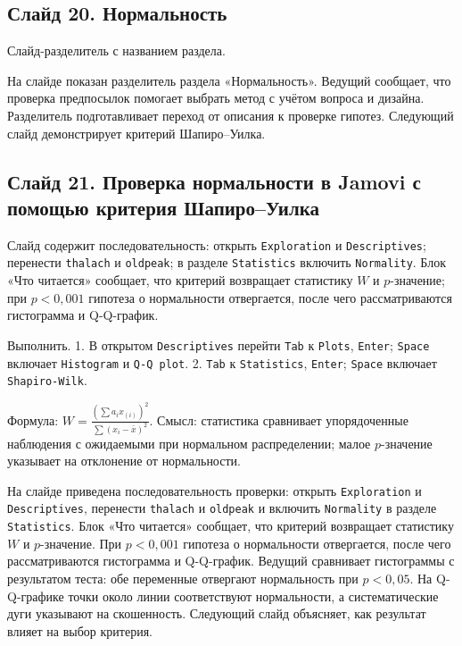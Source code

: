 \documentclass[11pt,a4paper]{article}
\begin{document}
\subsection*{Слайд 20. Нормальность}
\begin{onslide}
Слайд-разделитель с названием раздела.
\end{onslide}
На слайде показан разделитель раздела «Нормальность». Ведущий сообщает, что проверка предпосылок помогает выбрать метод с учётом вопроса и дизайна. Разделитель подготавливает переход от описания к проверке гипотез. Следующий слайд демонстрирует критерий Шапиро--Уилка.

\subsection*{Слайд 21. Проверка нормальности в Jamovi с помощью критерия Шапиро–Уилка}
\begin{onslide}
Слайд содержит последовательность: открыть \texttt{Exploration} и \texttt{Descriptives}; перенести \texttt{thalach} и \texttt{oldpeak}; в разделе \texttt{Statistics} включить \texttt{Normality}. Блок «Что читается» сообщает, что критерий возвращает статистику $W$ и $p$-значение; при $p < 0{,}001$ гипотеза о нормальности отвергается, после чего рассматриваются гистограмма и Q-Q-график.
\end{onslide}
\begin{jamovi}
Выполнить. 1. В открытом \texttt{Descriptives} перейти \texttt{Tab} к \texttt{Plots}, \texttt{Enter}; \texttt{Space} включает \texttt{Histogram} и \texttt{Q-Q plot}. 2. \texttt{Tab} к \texttt{Statistics}, \texttt{Enter}; \texttt{Space} включает \texttt{Shapiro-Wilk}.
\par Формула: $W=\frac{(\sum a_i x_{(i)})^2}{\sum(x_i-\bar{x})^2}$. Смысл: статистика сравнивает упорядоченные наблюдения с ожидаемыми при нормальном распределении; малое $p$-значение указывает на отклонение от нормальности.
\end{jamovi}
На слайде приведена последовательность проверки: открыть \texttt{Exploration} и \texttt{Descriptives}, перенести \texttt{thalach} и \texttt{oldpeak} и включить \texttt{Normality} в разделе \texttt{Statistics}. Блок «Что читается» сообщает, что критерий возвращает статистику $W$ и $p$-значение. При $p < 0{,}001$ гипотеза о нормальности отвергается, после чего рассматриваются гистограмма и Q-Q-график. Ведущий сравнивает гистограммы с результатом теста: обе переменные отвергают нормальность при $p < 0{,}05$. На Q-Q-графике точки около линии соответствуют нормальности, а систематические дуги указывают на скошенность. Следующий слайд объясняет, как результат влияет на выбор критерия.
\end{document}
